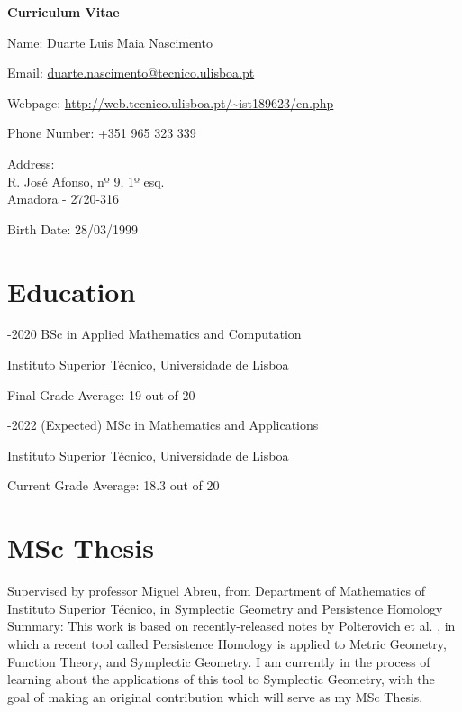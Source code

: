 \documentclass[11pt]{article} %
\begin{document}

{\LARGE\bfseries Curriculum Vitae} %
\bigskip %

Name: Duarte Luis Maia Nascimento
\smallskip

Email: \href{mailto:duarte.nascimento@tecnico.ulisboa.pt}{duarte.nascimento@tecnico.ulisboa.pt} %
\smallskip

Webpage: \url{http://web.tecnico.ulisboa.pt/~ist189623/en.php}

\smallskip

Phone Number: +351 965 323 339 %
\smallskip


Address:\\
R. José Afonso, nº 9, 1º esq.\\ %
Amadora - 2720-316
\smallskip

Birth Date: 28/03/1999 %



\section*{Education}

-2020 BSc in Applied Mathematics and Computation
\smallskip

Instituto Superior Técnico, Universidade de Lisboa

Final Grade Average: 19 out of 20

\medskip

-2022 (Expected) MSc in Mathematics and Applications
\smallskip

Instituto Superior Técnico, Universidade de Lisboa

Current Grade Average: 18.3 out of 20

\section*{MSc Thesis}

Supervised by professor Miguel Abreu, from Department of Mathematics of Instituto Superior Técnico, in Symplectic Geometry and Persistence Homology\\
Summary: This work is based on recently-released notes by Polterovich et al. \cite{polterovich}, in which a recent tool called Persistence Homology is applied to Metric Geometry, Function Theory, and Symplectic Geometry. I am currently in the process of learning about the applications of this tool to Symplectic Geometry, with the goal of making an original contribution which will serve as my MSc Thesis.
\end{document}
